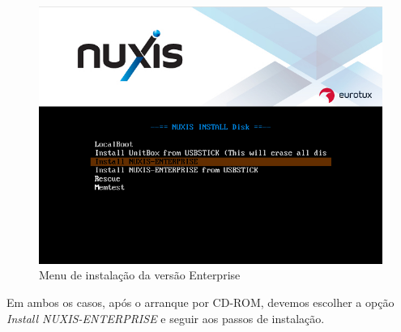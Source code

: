 \begin{figure}[H]
	\begin{center}
	\includegraphics[scale=0.4]{screenshots/install/nuxis/bootmenu.png}
	\caption{Menu de instalação da versão Enterprise}
	\label{fig:boot_install_screen_enterprise}
	\end{center}
\end{figure}

Em ambos os casos, após o arranque por CD-ROM, devemos escolher a opção \emph{Install NUXIS-ENTERPRISE} e seguir aos passos de instalação.

